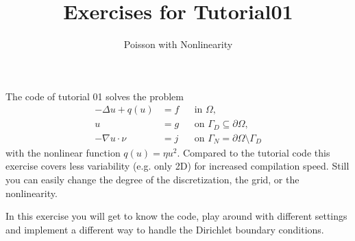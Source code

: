\documentclass[12pt,a4paper]{article}
\title{\textbf{Exercises for Tutorial01}}
\subtitle{Poisson with Nonlinearity}
\begin{document}
\exerciseheader

The code of tutorial 01 solves the problem
\begin{align*}
  -\Delta u + q(u) &= f &&\text{in $\Omega$},\\
  u &= g &&\text{on $\Gamma_D\subseteq\partial\Omega$},\\
  -\nabla u\cdot \nu &= j &&\text{on $\Gamma_N=\partial\Omega\setminus\Gamma_D$}
\end{align*}
with the nonlinear function $q(u)=\eta u^2$.  Compared to the tutorial
code this exercise covers less variability (e.g. only 2D) for
increased compilation speed. Still you can easily change the degree of
the discretization, the grid, or the nonlinearity.

In this exercise you will get to know the code, play around with
different settings and implement a different way to handle the
Dirichlet boundary conditions.
\end{document}
